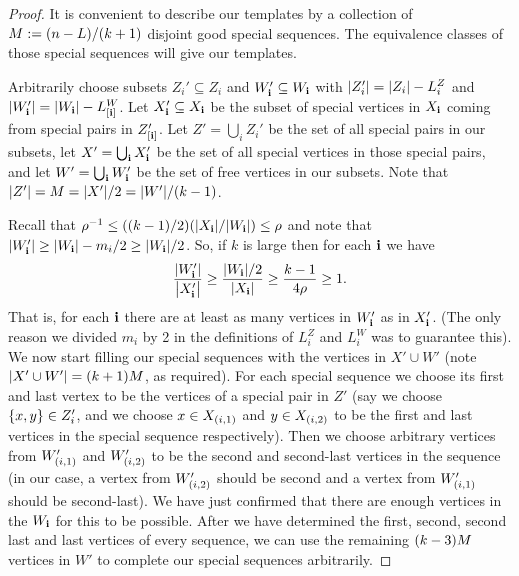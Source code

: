 \documentclass[11pt,english]{article}
\theoremstyle{plain}
\theoremstyle{plain}
\theoremstyle{plain}
\theoremstyle{plain}
\theoremstyle{plain}
\theoremstyle{definition}
\theoremstyle{definition}
\theoremstyle{remark}
\theoremstyle{remark}
\theoremstyle{plain}
\theoremstyle{definition}
\theoremstyle{definition}
\theoremstyle{plain}
\theoremstyle{plain}
\theoremstyle{plain}
\theoremstyle{plain}
\theoremstyle{remark}
\theoremstyle{plain}
\theoremstyle{definition}
\let\originalleft\left
\let\originalright\right
\renewcommand{\left}{\mathopen{}\mathclose\bgroup\originalleft}
\renewcommand{\right}{\aftergroup\egroup\originalright}
\begin{document}
\begin{proof}
It is convenient to describe our templates by a collection of $M:=\left(n-L\right)/\left(k+1\right)$
disjoint good special sequences. The equivalence classes of those
special sequences will give our templates.

Arbitrarily choose subsets $Z_{i}'\subseteq Z_{i}$ and $W_{\mathbf{i}}'\subseteq W_{\mathbf{i}}$
with $\left|Z_{i}'\right|=\left|Z_{i}\right|-L_{i}^{Z}$ and $\left|W_{\bi}'\right|=\left|W_{\bi}\right|-L_{\left[\bi\right]}^{W}$.
Let $X_{\mathbf{i}}'\subseteq X_{\mathbf{i}}$ be the subset of special vertices
in $X_{\mathbf{i}}$ coming from special pairs in $Z_{\left[\bi\right]}'$.
Let $Z'=\bigcup_{i}Z_{i}'$ be the set of all special pairs in our
subsets, let $X'=\bigcup_{\mathbf{i}}X_{\mathbf{i}}'$ be the set of all special
vertices in those special pairs, and let $W'=\bigcup_{\mathbf{i}}W_{\mathbf{i}}'$
be the set of free vertices in our subsets. Note that $\left|Z'\right|=M=\left|X'\right|/2=\left|W'\right|/\left(k-1\right)$.

Recall that $\rho^{-1}\le\left(\left(k-1\right)/2\right)\left(\left|X_{\bi}\right|/\left|W_{\bi}\right|\right)\le\rho$
and note that $\left|W_{\bi}'\right|\ge\left|W_{\bi}\right|-m_{i}/2\ge\left|W_{\bi}\right|/2$.
So, if $k$ is large then for each $\mathbf{i}$ we have
\[
\frac{\left|W_{\bi}'\right|}{\left|X_{\bi}'\right|}\ge\frac{\left|W_{\bi}\right|/2}{\left|X_{\bi}\right|}\ge\frac{k-1}{4\rho}\ge1.
\]
That is, for each $\mathbf{i}$ there are at least as many vertices in $W_{\mathbf{i}}'$
as in $X_{\mathbf{i}}'$. (The only reason we divided $m_{i}$ by 2 in the
definitions of $L_{i}^{Z}$ and $L_{i}^{W}$ was to guarantee this).
We now start filling our special sequences with the vertices in $X'\cup W'$
(note $\left|X'\cup W'\right|=\left(k+1\right)M$, as required). For
each special sequence we choose its first and last vertex to be the
vertices of a special pair in $Z'$ (say we choose $\left\{ x,y\right\} \in Z_{i}'$,
and we choose $x\in X_{\left(i,1\right)}$ and $y\in X_{\left(i,2\right)}$
to be the first and last vertices in the special sequence respectively).
Then we choose arbitrary vertices from $W_{\left(i,1\right)}'$ and
$W_{\left(i,2\right)}'$ to be the second and second-last vertices
in the sequence (in our case, a vertex from $W_{\left(i,2\right)}'$
should be second and a vertex from $W_{\left(i,1\right)}'$ should
be second-last). We have just confirmed that there are enough vertices
in the $W_{\mathbf{i}}$ for this to be possible. After we have determined
the first, second, second last and last vertices of every sequence,
we can use the remaining $\left(k-3\right)M$ vertices in $W'$ to
complete our special sequences arbitrarily.\end{proof}
\end{document}
